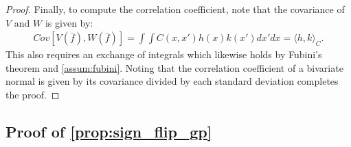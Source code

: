 \begin{proof}
Finally, to compute the correlation coefficient, note that the covariance of $V$ and $W$ is given by:
\begin{align*}
	Cov[ V( \bar f), W(\bar f) ] = \int\int C(x,x') h(x) k(x') dx' dx = \langle h, k \rangle_C.
\end{align*}
This also requires an exchange of integrals which likewise holds by Fubini's theorem and \cref{assum:fubini}. Noting that the correlation coefficient of a bivariate normal is given by its covariance divided by each standard deviation completes the proof.
\end{proof}

\subsection{Proof of \cref{prop:sign_flip_gp}}

